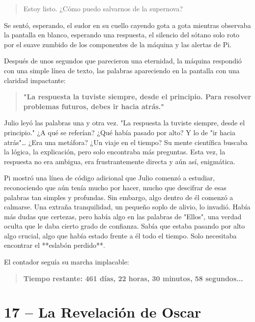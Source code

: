 \documentclass[a4paper,12pt]{book}
\begin{document}
\begin{quote}
    Estoy listo. ¿Cómo puedo salvarnos de la supernova?
\end{quote}

Se sentó, esperando, el sudor en su cuello cayendo gota a gota mientras observaba la pantalla en blanco, esperando una respuesta, el silencio del sótano solo roto por el suave zumbido de los componentes de la máquina y las alertas de Pi.

Después de unos segundos que parecieron una eternidad, la máquina respondió con una simple línea de texto, las palabras apareciendo en la pantalla con una claridad impactante:

\begin{quote}
    \textbf{"La respuesta la tuviste siempre, desde el principio. Para resolver problemas futuros, debes ir hacia atrás."}
\end{quote}

Julio leyó las palabras una y otra vez. "La respuesta la tuviste siempre, desde el principio." ¿A qué se referían? ¿Qué había pasado por alto? Y lo de "ir hacia atrás"… ¿Era una metáfora? ¿Un viaje en el tiempo? Su mente científica buscaba la lógica, la explicación, pero solo encontraba más preguntas. Esta vez, la respuesta no era ambigua, era frustrantemente directa y aún así, enigmática.

Pi mostró una línea de código adicional que Julio comenzó a estudiar, reconociendo que aún tenía mucho por hacer, mucho que descifrar de esas palabras tan simples y profundas. Sin embargo, algo dentro de él comenzó a calmarse. Una extraña tranquilidad, un pequeño soplo de alivio, lo invadió. Había más dudas que certezas, pero había algo en las palabras de "Ellos", una verdad oculta que le daba cierto grado de confianza. Sabía que estaba pasando por alto algo crucial, algo que había estado frente a él todo el tiempo. Solo necesitaba encontrar el **eslabón perdido**.

El contador seguía su marcha implacable:

\begin{quote}
    \textbf{Tiempo restante: 461 días, 22 horas, 30 minutos, 58 segundos...}
\end{quote}

\cleardoublepage %

\chapter*{17 – La Revelación de Oscar}
\end{document}

